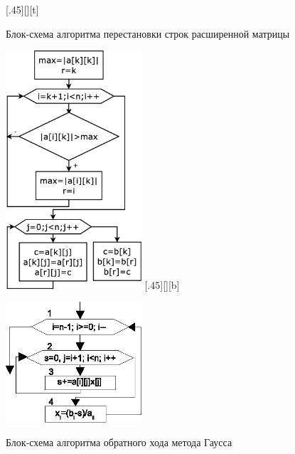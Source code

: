 \begin{figure}[H]
\begin{floatrow}
[.45\textwidth][\FBheight][t]
{\caption{Блок-схема алгоритма перестановки строк расширенной матрицы}
\label{ch06:refDrawing12}}
{\includegraphics[width=0.45\textwidth,keepaspectratio]{img/ris_6_13}}\hspace*{0.05\textwidth}
%
[.45\textwidth][\FBheight][b]
{\caption{Блок-схема алгоритма обратного хода метода Гаусса}
\label{ch06:refDrawing13}}
{\includegraphics[width=0.45\textwidth,keepaspectratio]{img/ris_6_14}}
\end{floatrow}
\end{figure}



